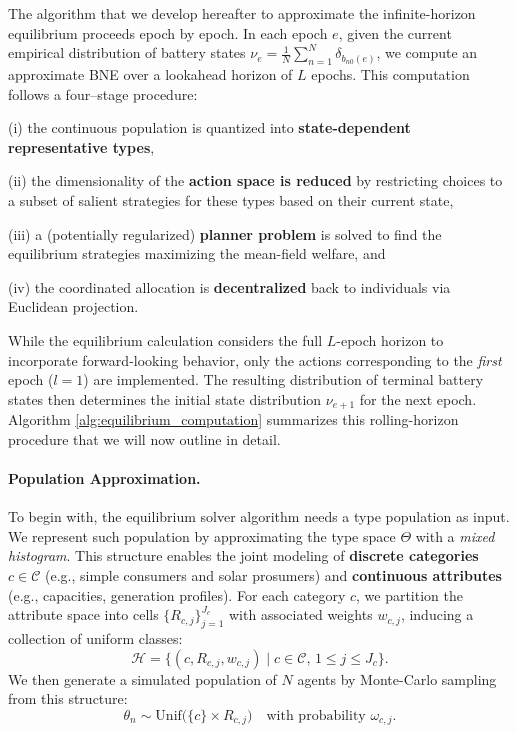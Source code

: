 \documentclass[12pt, notitlepage]{article}
\begin{document}
The algorithm that we develop hereafter to approximate the infinite-horizon equilibrium proceeds epoch by epoch. In each epoch $e$, given the current empirical distribution of battery states $\nu_e=\frac{1}{N}\sum_{n=1}^N \delta_{b_{n0}(e)}$, we compute an approximate BNE over a lookahead horizon of $L$ epochs. This computation follows a four–stage procedure:

(i) the continuous population is quantized into \textbf{state-dependent representative types},

(ii) the dimensionality of the \textbf{action space is reduced} by restricting choices to a subset of salient strategies  for these types based on their current state,

(iii) a (potentially regularized) \textbf{planner problem} is solved to find the equilibrium strategies maximizing the mean-field welfare, and

(iv) the coordinated allocation is \textbf{decentralized} back to individuals via Euclidean projection.

While the equilibrium calculation considers the full $L$-epoch horizon to incorporate forward-looking behavior, only the actions corresponding to the \textit{first} epoch ($l=1$) are implemented. The resulting distribution of terminal battery states then determines the initial state distribution $\nu_{e+1}$ for the next epoch. Algorithm \ref{alg:equilibrium_computation} summarizes this rolling-horizon procedure that we will now outline in detail.


\paragraph{Population Approximation.} 
To begin with, the equilibrium solver algorithm needs a type population as input. We represent such population by approximating the type space $\Theta$ with a \emph{mixed histogram}. This structure enables the joint modeling of \textbf{discrete categories} $c \in \mathcal{C}$ (e.g., simple consumers and solar prosumers) and \textbf{continuous attributes} (e.g., capacities, generation profiles). For each category $c$, we partition the attribute space into cells $\{R_{c,j}\}_{j=1}^{J_c}$ with associated weights $w_{c,j}$, inducing a collection of uniform classes:
\[
\mathcal{H} = \big\{(c, R_{c,j}, w_{c,j}) \mid c \in \mathcal{C}, \, 1 \le j \le J_c \big\}.
\]
We then generate a  simulated population of $N$ agents by Monte-Carlo sampling from this structure:
\[
\theta_n \sim \mathrm{Unif}\big(\{c\} \times R_{c,j}\big) \quad \text{with probability } \omega_{c,j}.
\]
\end{document}
